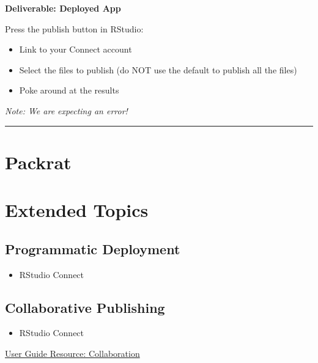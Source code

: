 \documentclass[]{book}
\providecommand{\tightlist}{%
  \setlength{\itemsep}{0pt}\setlength{\parskip}{0pt}}
\theoremstyle{definition}
\theoremstyle{definition}
\theoremstyle{definition}
\theoremstyle{remark}
\begin{document}
\textbf{Deliverable: Deployed App}

Press the publish button in RStudio:

\begin{itemize}
\tightlist
\item
  Link to your Connect account
\item
  Select the files to publish (do NOT use the default to publish all the
  files)
\item
  Poke around at the results
\end{itemize}

\emph{Note: We are expecting an error!}

\begin{center}\rule{0.5\linewidth}{\linethickness}\end{center}

\hypertarget{packrat}{%
\section{Packrat}\label{packrat}}

\hypertarget{extended-topics}{%
\section{Extended Topics}\label{extended-topics}}

\hypertarget{programmatic-deployment}{%
\subsection{Programmatic Deployment}\label{programmatic-deployment}}

\begin{itemize}
\tightlist
\item
  RStudio Connect
\end{itemize}

\hypertarget{collaborative-publishing}{%
\subsection{Collaborative Publishing}\label{collaborative-publishing}}

\begin{itemize}
\tightlist
\item
  RStudio Connect
\end{itemize}

\href{https://docs.rstudio.com/connect/user/publishing.html\#collaboration}{User
Guide Resource: Collaboration}
\end{document}
